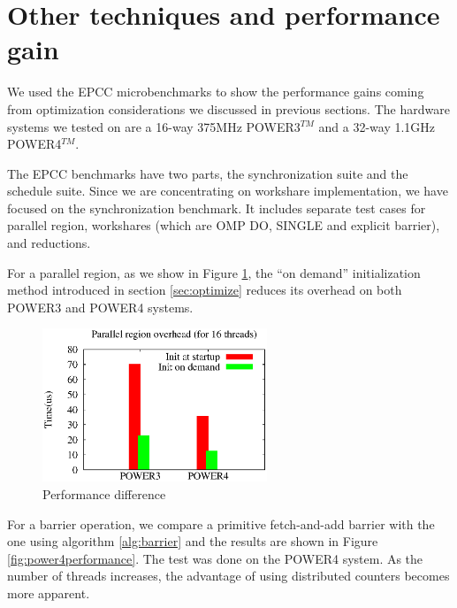 \section{Other techniques and performance gain}


We used the EPCC microbenchmarks\cite{Bul99} to show the performance
gains coming from optimization considerations we discussed in previous
sections. The hardware systems we tested on are a 16-way 375MHz
POWER3$^{TM}$ and a 32-way 1.1GHz POWER4$^{TM}$.

The EPCC benchmarks have two parts, the synchronization suite and the
schedule suite. Since we are concentrating on workshare
implementation, we have focused on the synchronization benchmark. It
includes separate test cases for parallel region, workshares (which are
OMP DO, SINGLE and explicit barrier), and reductions.

For a parallel region, as we show in Figure \ref{fig:compare}, the ``on
demand'' initialization method introduced in section
\ref{sec:optimize} reduces its overhead on both POWER3 and POWER4
systems. 


\begin{figure}[!h]
  \begin{center}
    \includegraphics[angle=0, width=0.60\textwidth]{compare.eps}
    \caption{\footnotesize Performance difference}
    \label{fig:compare}
  \end{center}
\end{figure}

For a barrier operation, we compare a primitive fetch-and-add barrier
with the one using algorithm \ref{alg:barrier} and the results are
shown in Figure \ref{fig:power4performance}. The test was done on the
POWER4 system. As the number of threads increases, the advantage of
using distributed counters becomes more apparent.


